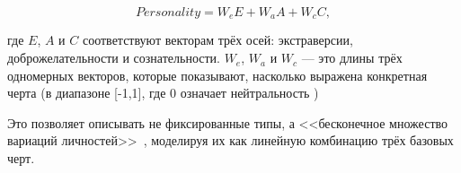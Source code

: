 \begin{equation}
	\label{equ:personality}
	Personality = W_eE + W_aA + W_cC, 
\end{equation}

где $E$, $A$ и $C$ соответствуют векторам трёх осей: экстраверсии, доброжелательности и сознательности. 
$W_e$, $W_a$ и $W_c$ — это длины трёх одномерных векторов, которые показывают, насколько выражена конкретная черта (в диапазоне [-1,1], где 0 означает нейтральность \cite{Nardelli2025EmpatheticCompanions})

Это позволяет описывать не фиксированные типы, а <<бесконечное множество вариаций личностей>>~\cite{}, моделируя их как линейную комбинацию трёх базовых черт.